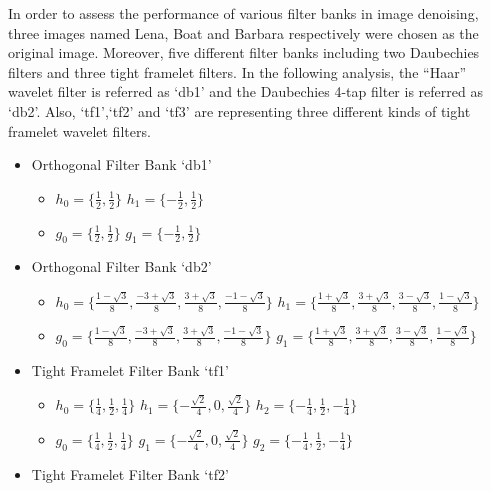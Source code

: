 In order to assess the performance of various filter banks in image denoising, three images named Lena, Boat and Barbara respectively were chosen as the original image. Moreover, five different filter banks including two Daubechies filters and three tight framelet filters. In the following analysis, the ``Haar'' wavelet filter is referred as `db1' and the Daubechies 4-tap filter is referred as `db2'. Also, `tf1',`tf2' and `tf3' are representing three different kinds of tight framelet wavelet filters.
\begin{itemize}
    \item Orthogonal Filter Bank `db1' 
    \begin{itemize}
        \item $h_0 = \{\frac{1}{2},\frac{1}{2}\}$ \qquad $h_1 = \{-\frac{1}{2},\frac{1}{2}\}$
        \item $g_0 = \{\frac{1}{2},\frac{1}{2}\}$ \qquad $g_1 = \{-\frac{1}{2},\frac{1}{2}\}$

    \end{itemize}

    \item Orthogonal Filter Bank `db2' 
    \begin{itemize}
        \item $h_0 = \{\frac{1-\sqrt3}{8},\frac{-3+\sqrt3}{8},\frac{3+\sqrt3}{8},\frac{-1-\sqrt3}{8}\}$ \qquad $h_1 = \{\frac{1+\sqrt3}{8},\frac{3+\sqrt3}{8},\frac{3-\sqrt3}{8},\frac{1-\sqrt3}{8}\}$
        \item $g_0 = \{\frac{1-\sqrt3}{8},\frac{-3+\sqrt3}{8},\frac{3+\sqrt3}{8},\frac{-1-\sqrt3}{8}\}$ \qquad $g_1 = \{\frac{1+\sqrt3}{8},\frac{3+\sqrt3}{8},\frac{3-\sqrt3}{8},\frac{1-\sqrt3}{8}\}$
    \end{itemize}
    \item Tight Framelet Filter Bank `tf1' 
    \begin{itemize}
        \item $h_0 = \{\frac{1}{4},\frac{1}{2},\frac{1}{4}\}$ \qquad $h_1 = \{-\frac{\sqrt2}{4},0,\frac{\sqrt2}{4}\}$ \qquad $h_2 = \{-\frac{1}{4},\frac{1}{2},-\frac{1}{4}\}$
        \item $g_0 = \{\frac{1}{4},\frac{1}{2},\frac{1}{4}\}$ \qquad $g_1 = \{-\frac{\sqrt2}{4},0,\frac{\sqrt2}{4}\}$ \qquad $g_2 = \{-\frac{1}{4},\frac{1}{2},-\frac{1}{4}\}$
    \end{itemize}

    \item Tight Framelet Filter Bank `tf2' 
    \begin{itemize}


\end{itemize}
\end{itemize}
